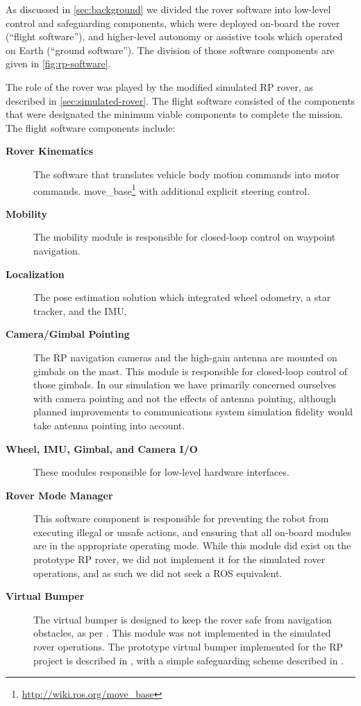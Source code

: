 \documentclass[twocolumn,letterpaper]{IEEEAerospaceCLS}  %
\begin{document}
As discussed in \cref{sec:background} we divided the rover software into low-level control and safeguarding components, which were deployed on-board the rover (``flight software''), and higher-level autonomy or assistive tools which operated on Earth (``ground software'').  
The division of those software components are given in \cref{fig:rp-software}.   

The role of the rover was played by the modified simulated RP rover, as described in \cref{sec:simulated-rover}.  The flight software consisted of the components that were designated the minimum viable components to complete the mission.  The flight software components include:

\begin{description}
\item[\textbf{Rover Kinematics}] The software that translates vehicle body motion commands into motor commands. move\_base\footnote{\url{http://wiki.ros.org/move_base}} with additional explicit steering control.
\item[\textbf{Mobility}] The mobility module is responsible for closed-loop control on waypoint navigation.
\item[\textbf{Localization}]  The pose estimation solution which integrated wheel odometry, a star tracker, and the IMU.  
\item[\textbf{Camera/Gimbal Pointing}] The RP navigation cameras and the high-gain antenna are mounted on gimbals on the mast.
This module is responsible for closed-loop control of those gimbals.  
In our simulation we have primarily concerned ourselves with camera pointing and not the effects of antenna pointing, although planned improvements to communications system simulation fidelity would take antenna pointing into account.  
\item[\textbf{Wheel, IMU, Gimbal, and Camera I/O}]  These modules responsible for low-level hardware interfaces.  
\item[\textbf{Rover Mode Manager}] This software component is responsible for preventing the robot from executing illegal or unsafe actions, and ensuring that all on-board modules are in the appropriate operating mode.  
While this module did exist on the prototype RP rover, we did not implement it for the simulated rover operations, and as such we did not seek a ROS equivalent.
\item[\textbf{Virtual Bumper}]  The virtual bumper is designed to keep the rover safe from navigation obstacles, as per \cite{matthies1997fast}. 
This module was not implemented in the simulated rover operations. 
The prototype virtual bumper implemented for the RP project is described in \cite{nefian2017structured}, with a simple safeguarding scheme described in \cite{furlong2016safeguarding}.
\end{description}
\end{document}
